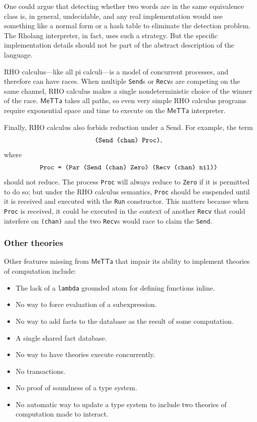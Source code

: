 \documentclass{article}
\begin{document}
One could argue that detecting whether two words are in the same equivalence class is, in general, undecidable, and any real implementation would use something like a normal form or a hash table to eliminate the detection problem.  The Rholang interpreter, in fact, uses such a strategy.  But the specific implementation details should not be part of the abstract description of the language.

RHO calculus---like all pi calculi---is a model of concurrent processes, and therefore can have races.  When multiple \verb+Send+s or \verb+Recv+s are competing on the same channel, RHO calculus makes a single nondeterministic choice of the winner of the race.  $\mathsf{MeTTa}$ takes all paths, so even very simple RHO calculus programs require exponential space and time to execute on the $\mathsf{MeTTa}$ interpreter.

Finally, RHO calculus also forbids reduction under a Send.  For example, the term 
\[\mbox{\tt(Send (chan) Proc)},\]
where
\[\mbox{\tt Proc = (Par (Send (chan) Zero) (Recv (chan) nil))}\]
should not reduce.  The process \verb+Proc+ will always reduce to \verb+Zero+ if it is permitted to do so; but under the RHO calculus semantics, \verb+Proc+ should be suspended until it is received and executed with the \verb+Run+ constructor.  This matters because when \verb+Proc+ is received, it could be executed in the context of another \verb+Recv+ that could interfere on \verb+(chan)+ and the two \verb+Recv+s would race to claim the \verb+Send+.

\subsubsection{Other theories}

Other features missing from $\mathsf{MeTTa}$ that impair its ability to implement theories of computation include:
\begin{itemize}
    \item The lack of a \verb+lambda+ grounded atom for defining functions inline.
    \item No way to force evaluation of a subexpression.
    \item No way to add facts to the database as the result of some computation.
    \item A single shared fact database.
    \item No way to have theories execute concurrently.
    \item No transactions.
    \item No proof of soundness of a type system.
    \item No automatic way to update a type system to include two theories of computation made to interact.
\end{itemize}
\end{document}
